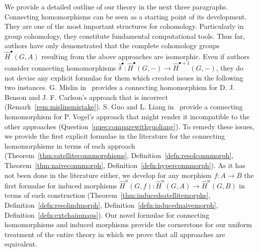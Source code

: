 \documentclass[12pt,a4paper]{article}
\numberwithin{equation}{section}
\theoremstyle{nonumberplain}
\begin{document}
We provide a detailed outline of our theory in the next three paragraphs. Connecting homomorphisms can be seen as a starting point of its development. They are one of the most important structures for cohomology. Particularly in group cohomology, they constitute fundamental computational tools. Thus far, authors have only demonstrated that the complete cohomology groups $\widehat{H}^{\bullet}(G, A)$ resulting from the above approaches are isomorphic. Even if authors consider connecting homomorphisms $\widehat{\delta}^{\bullet}: \widehat{H}^{\bullet}(G, -) \rightarrow \widehat{H}^{\bullet+1}(G, -)$, they do not devise any explicit formulae for them which created issues in the following two instances. G.\! Mislin in~\cite{mis94} provides a connecting homomorphism for D.\! J.\! Benson and J.\! F.\! Carlson's approach that is incorrect (Remark~\ref{rem:mislinsmistake}). S.\! Guo and L.\! Liang in~\cite{guo23} provide a connecting homomorphism for P.\! Vogel's approach that might render it incompatible to the other approaches (Question~\ref{ques:comparewithguoliang}). To remedy these issues, we provide the first explicit formulae in the literature for the connecting homomorphisms in terms of each approach (Theorem~\ref{thm:satelliteconnmorphisms}, Definition~\ref{defn:resolconnmorph}, Theorem~\ref{thm:naiveconnmorph}, Definition~\ref{defn:hyperconnmorph}). As it has not been done in the literature either, we develop for any morphism $f: A \rightarrow B$ the first formulae for induced morphisms $\widehat{H}^n(G, f): \widehat{H}^n(G, A) \rightarrow \widehat{H}^n(G, B)$ in terms of each construction (Theorem~\ref{thm:inducedsatellitemorphs}, Definition~\ref{defn:resolindmorph}, Definition~\ref{defn:inducednaivemorph}, Definition~\ref{defn:extchainmaps}). Our novel formulae for connecting homomorphisms and induced morphisms provide the cornerstone for our uniform treatment of the entire theory in which we prove that all approaches are equivalent. \\
\end{document}
